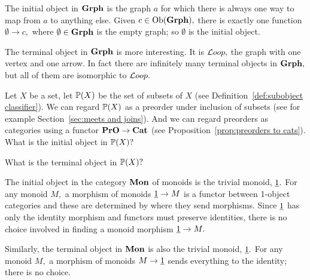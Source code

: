 \documentclass[CT4S-EN-RU]{subfiles}
\begin{document}
\begin{exampleRUS}\label{ex:universal obs in set}
\end{exampleRUS}

\begin{exampleENG}
The initial object in ${\mathbf{Grph}}$ is the graph $a$ for which there is always one way to map from $a$ to anything else. Given $c\in\textnormal{Ob}({\mathbf{Grph}}),$ there is exactly one function $\emptyset\to c,$ where $\emptyset\in{\mathbf{Grph}}$ is the empty graph; so $\emptyset$ is the initial object.

The terminal object in ${\mathbf{Grph}}$ is more interesting. It is ${\mathcal{L} oop},$ the graph with one vertex and one arrow. In fact there are infinitely many terminal objects in ${\mathbf{Grph}},$ but all of them are isomorphic to ${\mathcal{L} oop}.$ 
\end{exampleENG}

\begin{exampleRUS}
\end{exampleRUS}

\begin{exerciseENG}
Let $X$ be a set, let ${\mathbb P}(X)$ be the set of subsets of $X$ (see Definition~\ref{def:subobject classifier}). We can regard ${\mathbb P}(X)$ as a preorder under inclusion of subsets (see for example Section~\ref{sec:meets and joins}). And we can regard preorders as categories using a functor ${\mathbf{PrO}}\rightarrow{\mathbf{Cat}}$ (see Proposition~\ref{prop:preorders to cats}).
\sexc What is the initial object in ${\mathbb P}(X)?$
\item What is the terminal object in ${\mathbb P}(X)?$ 
\endsexc
\end{exerciseENG}

\begin{exerciseRUS}
\end{exerciseRUS}

\begin{exampleENG}\label{ex:initial monoid terminal monoid}
The initial object in the category ${\mathbf{Mon}}$ of monoids is the trivial monoid, $\underline{1}.$ For any monoid $M,$ a morphism of monoids $\underline{1}\rightarrow M$ is a functor between 1-object categories and these are determined by where they send morphisms. Since $\underline{1}$ has only the identity morphism and functors must preserve identities, there is no choice involved in finding a monoid morphism $\underline{1}\rightarrow M.$

Similarly, the terminal object in ${\mathbf{Mon}}$ is also the trivial monoid, $\underline{1}.$ For any monoid $M,$ a morphism of monoids $M\rightarrow\underline{1}$ sends everything to the identity; there is no choice.
\end{exampleENG}
\end{document}
